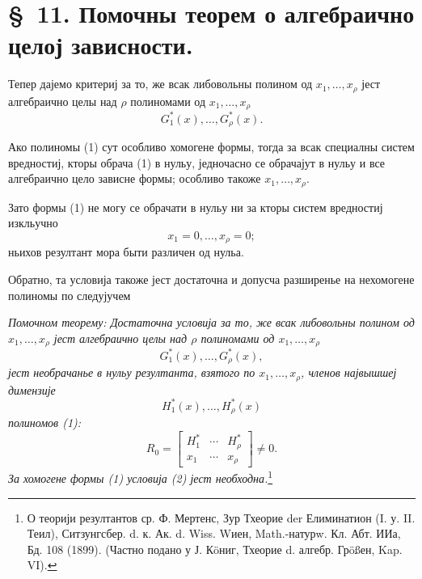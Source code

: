 ﻿\documentclass[11pt]{article}
\begin{document}
\section*{\S\ 11. Помочны теорем о алгебраично целој зависности.}

Тепер дајемо критериј за то, же всак либовольны полином од $x_1,\ldots,x_\rho$ јест алгебраично целы над $\rho$ полиномами од $x_1,\ldots,x_\rho$
\begin{equation}
  G_1^*(x),\ldots,G_\rho^*(x).
\tag{1}
\end{equation}

Ако полиномы (1) сут особливо хомогене формы, тогда за всак специалны систем вредностиј, кторы обрача (1) в нульу, једночасно се обрачајут в нульу и все алгебраично цело зависне формы; особливо такоже $x_1,\ldots,x_\rho$.

Зато формы (1) не могу се обрачати в нульу ни за кторы систем вредностиј изкльучно
\[
  x_1=0,\ldots,x_\rho=0;
\]
ньихов резултант мора быти различен од нульа.

Обратно, та условија такоже јест достаточна и допусча разширенье на нехомогене полиномы по следујучем

{\itshape Помочном теорему: Достаточна условија за то, же всак либовольны полином од $x_1,\ldots,x_\rho$ јест алгебраично целы над $\rho$ полиномами од $x_1,\ldots,x_\rho$}
\[
  G_1^*(x),\ldots,G_\rho^*(x),
\]
{\itshape јест необрачанье в нульу резултанта, взятого по $x_1,\ldots,x_\rho$, членов највышшеј димензије}
\[
  H_1^*(x),\ldots,H_\rho^*(x)
\]
{\itshape полиномов (1):}
\begin{equation}
  R_0=\left[
  \begin{array}{ccc}
    H_1^*&\cdots&H_\rho^*\\
    x_1&\cdots&x_\rho
  \end{array}
  \right]\ne0.
\tag{2}
\end{equation}
{\itshape За хомогене формы (1) условија (2) јест необходна.}\footnote{О теорији резултантов ср. Ф. Мертенс, Зур Тхеорие der Елиминатион (I. у. II. Теил), Ситзунгсбер. d. к. Ак. d. Wiss. Wиен, Math.-натурw. Кл. Абт. ИИа, Бд. 108 (1899). (Частно подано у Ј. Кöниг, Тхеорие d. алгебр. Грößен, Kap. VI).}
\end{document}
